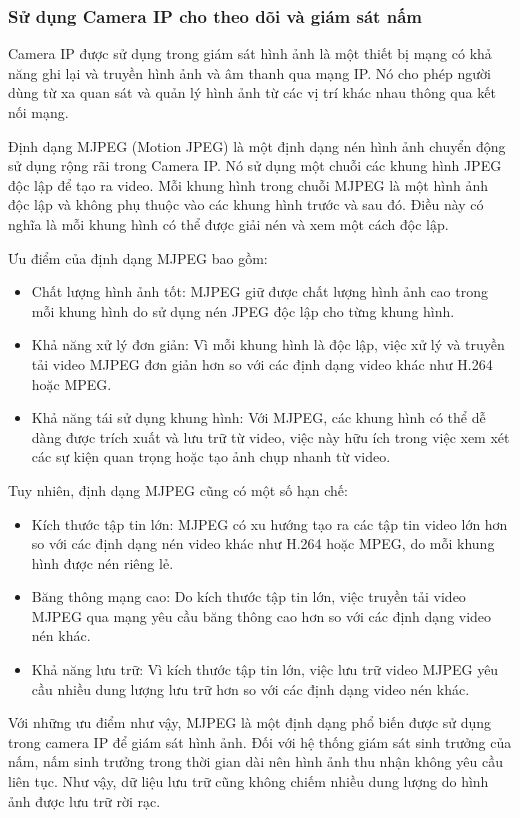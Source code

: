 \subsubsection{Sử dụng Camera IP cho theo dõi và giám sát nấm}

Camera IP được sử dụng trong giám sát hình ảnh là một thiết bị mạng có khả năng ghi lại và truyền hình ảnh và âm thanh qua mạng IP. Nó cho phép người dùng từ xa quan sát và quản lý hình ảnh từ các vị trí khác nhau thông qua kết nối mạng.

Định dạng MJPEG (Motion JPEG) là một định dạng nén hình ảnh chuyển động sử dụng rộng rãi trong Camera IP. Nó sử dụng một chuỗi các khung hình JPEG độc lập để tạo ra video. Mỗi khung hình trong chuỗi MJPEG là một hình ảnh độc lập và không phụ thuộc vào các khung hình trước và sau đó. Điều này có nghĩa là mỗi khung hình có thể được giải nén và xem một cách độc lập.

Ưu điểm của định dạng MJPEG bao gồm:
\begin{itemize}
    \item Chất lượng hình ảnh tốt: MJPEG giữ được chất lượng hình ảnh cao trong mỗi khung hình do sử dụng nén JPEG độc lập cho từng khung hình.
    \item Khả năng xử lý đơn giản: Vì mỗi khung hình là độc lập, việc xử lý và truyền tải video MJPEG đơn giản hơn so với các định dạng video khác như H.264 hoặc MPEG.
    \item Khả năng tái sử dụng khung hình: Với MJPEG, các khung hình có thể dễ dàng được trích xuất và lưu trữ từ video, việc này hữu ích trong việc xem xét các sự kiện quan trọng hoặc tạo ảnh chụp nhanh từ video.
\end{itemize}

Tuy nhiên, định dạng MJPEG cũng có một số hạn chế:
\begin{itemize}
    \item Kích thước tập tin lớn: MJPEG có xu hướng tạo ra các tập tin video lớn hơn so với các định dạng nén video khác như H.264 hoặc MPEG, do mỗi khung hình được nén riêng lẻ.
    \item Băng thông mạng cao: Do kích thước tập tin lớn, việc truyền tải video MJPEG qua mạng yêu cầu băng thông cao hơn so với các định dạng video nén khác.
    \item Khả năng lưu trữ: Vì kích thước tập tin lớn, việc lưu trữ video MJPEG yêu cầu nhiều dung lượng lưu trữ hơn so với các định dạng video nén khác.
\end{itemize}

Với những ưu điểm như vậy, MJPEG là một định dạng phổ biến được sử dụng trong camera IP để giám sát hình ảnh. Đối với hệ thống giám sát sinh trưởng của nấm, nấm sinh trưởng trong thời gian dài nên hình ảnh thu nhận không yêu cầu liên tục. Như vậy, dữ liệu lưu trữ cũng không chiếm nhiều dung lượng do hình ảnh được lưu trữ rời rạc.

